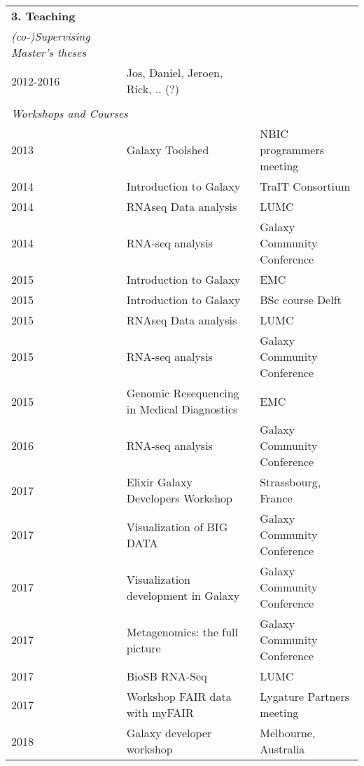\begin{table}
    \begin{tabular}{lll}
        \textbf{3. Teaching} \\
        \textit{(co-)Supervising Master’s theses} \\
        2012-2016 & Jos, Daniel, Jeroen, Rick, .. (?) \\
        \\
        \multicolumn{3}{l}{\textit{Workshops and Courses}} \\
        2013 & Galaxy Toolshed                                 & NBIC programmers meeting \\
        2014 & Introduction to Galaxy                          & TraIT Consortium \\
        2014 & RNAseq Data analysis                            & LUMC \\
        2014 & RNA-seq analysis                                & Galaxy Community Conference \\
        2015 & Introduction to Galaxy                          & EMC \\
        2015 & Introduction to Galaxy                          & BSc course Delft \\
        2015 & RNAseq Data analysis                            & LUMC \\
        2015 & RNA-seq analysis                                & Galaxy Community Conference \\
        2015 & Genomic Resequencing in Medical Diagnostics     & EMC \\
        2016 & RNA-seq analysis                                & Galaxy Community Conference \\
        2017 & Elixir Galaxy Developers Workshop               & Strassbourg, France \\
        2017 & Visualization of BIG DATA                       & Galaxy Community Conference \\
        2017 & Visualization development in Galaxy             & Galaxy Community Conference \\
        2017 & Metagenomics: the full picture                  & Galaxy Community Conference \\
        2017 & BioSB RNA-Seq                                   & LUMC \\
        2017 & Workshop FAIR data with myFAIR                  & Lygature Partners meeting \\
        2018 & Galaxy developer workshop                       & Melbourne, Australia \\

\end{tabular}
\end{table}
